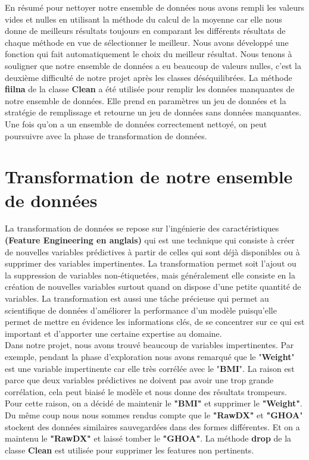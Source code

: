 \documentclass[12pt, french]{report}
\begin{document}
En résumé pour nettoyer notre ensemble de données nous avons rempli les valeurs vides et nulles en utilisant la méthode du calcul de la moyenne car elle nous donne de meilleurs résultats  toujours en comparant les différents résultats de chaque méthode en vue de sélectionner le meilleur. Nous avons développé une fonction qui fait automatiquement le choix du meilleur résultat. Nous tenons à souligner que notre ensemble de données a eu beaucoup de valeurs nulles, c'est la deuxième difficulté de notre projet après les classes déséquilibrées. La méthode \textbf{fiilna} de la classe \textbf{Clean} a été utilisée pour remplir les données manquantes de notre ensemble de données. Elle prend en paramètres un jeu de données et la stratégie de remplissage et retourne un jeu de données sans données manquantes. Une fois qu'on a un ensemble de données correctement nettoyé, on peut poursuivre avec la phase de transformation de données.

\section{Transformation de notre ensemble de données}
La transformation de données se repose sur l'ingénierie des caractéristiques \textbf{(Feature Engineering en anglais)} qui est une technique qui consiste à créer de nouvelles variables prédictives à partir de celles qui sont déjà disponibles ou à supprimer des variables impertinentes. La transformation permet soit l'ajout ou la suppression de variables non-étiquetées, mais généralement elle consiste en la création de nouvelles variables surtout quand on dispose d'une petite quantité de variables. La transformation est aussi une tâche précieuse qui permet au scientifique de données d'améliorer la performance d'un modèle puisqu'elle permet de mettre en évidence les informations clés, de se concentrer sur ce qui est important et d'apporter une certaine expertise au domaine. \\

Dans notre projet, nous avons trouvé beaucoup de variables impertinentes. Par exemple, pendant la phase d'exploration nous avons remarqué que le "\textbf{Weight}" est une variable impertinente car elle très corrélée avec le "\textbf{BMI}". La raison est parce que deux variables prédictives ne doivent pas avoir une trop grande corrélation, cela peut biaisé le modèle et nous donne des résultats trompeurs. Pour cette raison, on a décidé de maintenir le \textbf{"BMI"} et supprimer le \textbf{"Weight"}. Du même coup nous nous sommes rendus compte que le \textbf{"RawDX"} et \textbf{"GHOA}" stockent des données similaires sauvegardées dans des formes différentes. Et on a maintenu le \textbf{"RawDX"} et laissé tomber le \textbf{"GHOA"}. La méthode \textbf{drop} de la classe \textbf{Clean} est utilisée pour supprimer les features non pertinents.  
\end{document}

